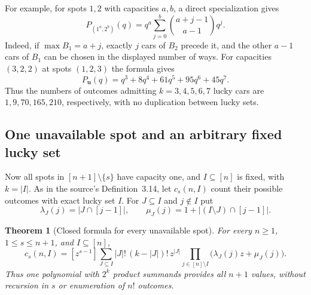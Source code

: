 \documentclass[11pt,a4paper]{article}
\newtheorem{theorem}{Theorem}[section]
\theoremstyle{definition}
\theoremstyle{remark}
\begin{document}
For example, for spots $1,2$ with capacities $a,b$, a direct
specialization gives
\[
 P_{(1^a,2^b)}(q)
   =q^a\sum_{j=0}^b\binom{a+j-1}{a-1}q^j.
\]
Indeed, if $\max B_1=a+j$, exactly $j$ cars of $B_2$ precede it,
and the other $a-1$ cars of $B_1$ can be chosen in the displayed
number of ways. For capacities $(3,2,2)$ at spots $(1,2,3)$ the formula
gives
\[
 P_{\boldsymbol u}(q)=q^3+8q^4+61q^5+95q^6+45q^7.
\]
Thus the numbers of outcomes admitting $k=3,4,5,6,7$ lucky cars are
$1,9,70,165,210$, respectively, with no duplication between lucky sets.

\subsection{One unavailable spot and an arbitrary fixed lucky set}

Now all spots in $[n+1]\setminus\{s\}$ have capacity one, and
$I\subseteq[n]$ is fixed, with $k=|I|$. As in the source's
Definition~3.14, let $c_s(n,I)$ count their possible outcomes with
exact lucky set $I$. For $J\subseteq I$ and $j\notin I$ put
\[
 \lambda_J(j)=|J\cap[j-1]|,\qquad
 \mu_J(j)=1+|(I\setminus J)\cap[j-1]|.
\]

\begin{theorem}[Closed formula for every unavailable spot]
For every $n\ge1$, $1\le s\le n+1$, and $I\subseteq[n]$,
\begin{equation}\label{eq:t97cut}
 c_s(n,I)=[z^{s-1}]
   \sum_{J\subseteq I}|J|!\,(k-|J|)!\,z^{|J|}
       \prod_{j\in[n]\setminus I}
                  \bigl(\lambda_J(j)z+\mu_J(j)\bigr).
\end{equation}
Thus one polynomial with $2^k$ product summands provides all $n+1$
values, without recursion in $s$ or enumeration of $n!$ outcomes.
\end{theorem}
\end{document}

